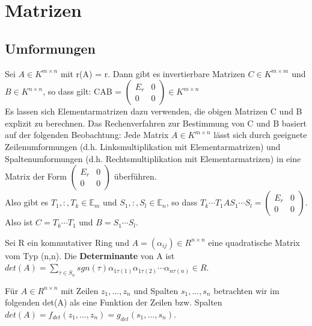 \chapter{Matrizen}

\section{Umformungen}
Sei $A \in K^{m \times n}$ mit r(A) = r. Dann gibt es invertierbare Matrizen $C \in K^{m \times m}$ und $B \in K^{n \times n}$, so dass gilt: CAB = $\begin{pmatrix} E_r & 0 \\ 0 & 0 \end{pmatrix} \in K^{m \times n}$\\
Es lassen sich Elementarmatrizen dazu verwenden, die obigen Matrizen C und B explizit zu berechnen. Das Rechenverfahren zur Bestimmung von C und B basiert auf der folgenden Beobachtung: Jede Matrix $A \in K^{m \times n}$ lässt sich durch geeignete Zeilenumformungen (d.h. Linksmultiplikation mit Elementarmatrizen) und Spaltenumformungen (d.h. Rechtsmultiplikation mit Elementarmatrizen) in eine Matrix der Form $\begin{pmatrix} E_r & 0 \\ 0 & 0 \end{pmatrix}$ überführen.\\
Also gibt es $T_1, :, T_k \in \mathbb{E}_m$ und $S_1, :, S_l \in \mathbb{E}_n$, so dass $T_k \cdots T_1AS_1 \cdots S_l = \begin{pmatrix} E_r & 0 \\ 0 & 0 \end{pmatrix}$.\\
Also ist $C = T_k \cdots T_1$ und $B = S_1 \cdots S_l$.


\begin{definition}
Sei R ein kommutativer Ring und $A = (\alpha_{ij}) \in R^{n \times n}$ eine quadratische Matrix vom Typ (n,n). Die \textbf{Determinante} von A ist $det(A) = \sum\nolimits_{\tau \in S_n} sgn(\tau) \alpha_{1\tau(1)} \alpha_{1 \tau(2)} \cdots \alpha_{n \tau(n)} \in R$.
\end{definition}

Für $A \in R^{n \times n}$ mit Zeilen $z_1, ..., z_n$ und Spalten $s_1, ..., s_n$ betrachten wir im folgenden det(A) als eine Funktion der Zeilen bzw. Spalten $det(A) = f_{det}(z_1,..., z_n) = g_{det}(s_1, ..., s_n)$.

